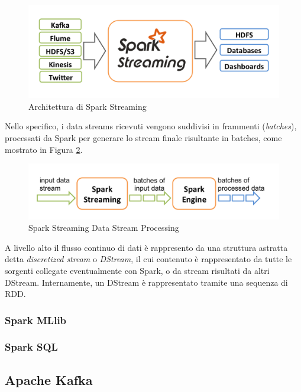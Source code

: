 \documentclass[11pt]{article}
\begin{document}
\begin{figure}[H]
	\centering
	\includegraphics[scale=0.50]{images/streaming-arch.png}
	\caption{Architettura di Spark Streaming}
	\label{spark-streaming}
\end{figure}

Nello specifico, i data streams ricevuti vengono suddivisi in frammenti (\textit{batches}), processati da Spark per generare lo stream finale risultante in batches, come mostrato in Figura \ref{spark-streaming-processing}.

\begin{figure}[H]
	\centering
	\includegraphics[scale=0.50]{images/streaming-flow.png}
	\caption{Spark Streaming Data Stream Processing}
	\label{spark-streaming-processing}
\end{figure}

A livello alto il flusso continuo di dati è rappresento da una struttura astratta detta \textit{discretized stream} o \textit{DStream}, il cui contenuto è rappresentato da tutte le sorgenti collegate eventualmente con Spark, o da stream risultati da altri DStream. Internamente, un DStream è rappresentato tramite una sequenza di RDD. 

\subsubsection{Spark MLlib}
\subsubsection{Spark SQL}

\subsection{Apache Kafka}
\end{document}
